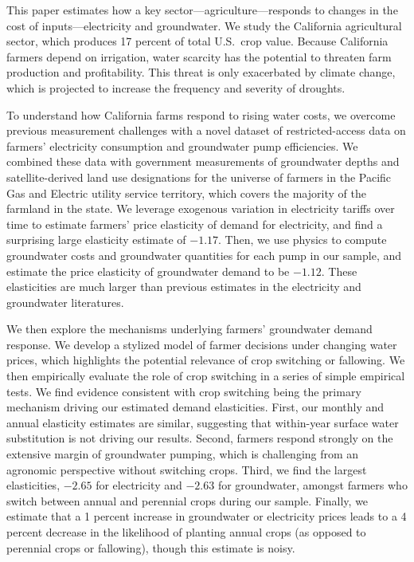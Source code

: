 %
%
This paper estimates how a key sector---agriculture---responds to changes in the cost of inputs---electricity and groundwater. We study the California agricultural sector, which produces 17 percent of total U.S.\ crop value. Because California farmers depend on irrigation, water scarcity has the potential to threaten farm production and profitability. This threat is only exacerbated by climate change, which is projected to increase the frequency and severity of droughts. 

To understand how California farms respond to rising water costs, we overcome previous measurement challenges with a novel dataset of restricted-access data on farmers' electricity consumption and groundwater pump efficiencies. We combined these data with government measurements of groundwater depths and satellite-derived land use designations for the universe of farmers in the Pacific Gas and Electric utility service territory, which covers the majority of the farmland in the state. We leverage exogenous variation in electricity tariffs over time to estimate farmers' price elasticity of demand for electricity, and find a surprising large elasticity estimate of $-1.17$. Then, we use physics to compute groundwater costs and groundwater quantities for each pump in our sample, and estimate the price elasticity of groundwater demand to be $-1.12$. These elasticities are much larger than previous estimates in the electricity and groundwater literatures.

We then explore the mechanisms underlying farmers' groundwater demand response. We develop a stylized model of farmer decisions under changing water prices, which highlights the potential relevance of crop switching or fallowing. We then empirically evaluate the role of crop switching in a series of simple empirical tests. We find evidence consistent with crop switching being the primary mechanism driving our estimated demand elasticities. First, our monthly and annual elasticity estimates are similar, suggesting that within-year surface water substitution is not driving our results. Second, farmers respond strongly on the extensive margin of groundwater pumping, which is challenging from an agronomic perspective without switching crops. Third, we find the largest elasticities, $-2.65$ for electricity and $-2.63$ for groundwater, amongst farmers who switch between annual and perennial crops during our sample. Finally, we estimate that a 1 percent increase in groundwater or electricity prices leads to a 4 percent decrease in the likelihood of planting annual crops (as opposed to perennial crops or fallowing), though this estimate is noisy.

